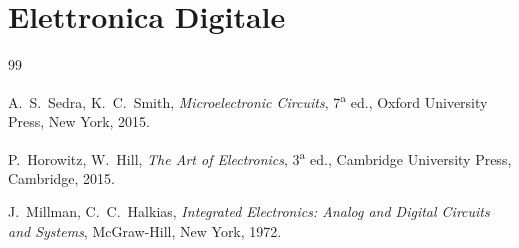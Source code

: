 \documentclass[11pt,a4paper]{report}
\begin{document}
\part{Elettronica Digitale}












\begin{thebibliography}{99}

A.~S.~Sedra, K.~C.~Smith,
\textit{Microelectronic Circuits},
7\textsuperscript{a} ed., Oxford University Press, New York, 2015.

P.~Horowitz, W.~Hill,
\textit{The Art of Electronics},
3\textsuperscript{a} ed., Cambridge University Press, Cambridge, 2015.

J.~Millman, C.~C.~Halkias,
\textit{Integrated Electronics: Analog and Digital Circuits and Systems},
McGraw-Hill, New York, 1972.

\end{thebibliography}
\end{document}
